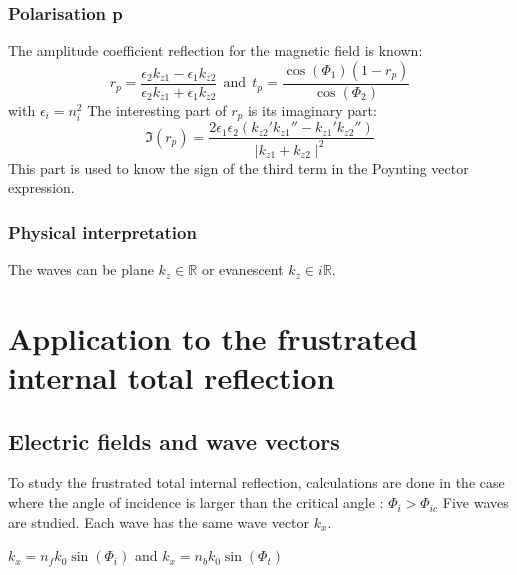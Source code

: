 \subsubsection{Polarisation p}
The amplitude coefficient reflection for the magnetic field is known:
$$
r_p=\frac{\epsilon_2k_{z1}-\epsilon_1k_{z2}}{\epsilon_2k_{z1}+\epsilon_1k_{z2}}
 \ \ \text{and} \ \ t_p = \frac{\cos(\Phi_1)(1-r_p)}{\cos(\Phi_2)}$$
with $\epsilon_i=n_i^2$
The interesting part of $r_p$ is its imaginary part:\\
\begin{equation*}
\Im(r_p) = \frac{2\epsilon_1\epsilon_2(k_{z2}'k_{z1}''-k_{z1}'k_{z2}'')}{\mid k_{z1}+k_{z2}\mid^2}
\end{equation*}
This part is used to know the sign of the third term in the Poynting vector expression.
\subsubsection{Physical interpretation}
The waves can be plane $k_{z}\in \mathbb{R}$ or evanescent $k_{z}\in i\mathbb{R}$.


\section{Application to the frustrated internal total reflection}

\subsection{Electric fields and wave vectors}
To study the frustrated total internal reflection, calculations are done in the case where the angle of incidence is larger than the critical angle :
$\Phi_i > \Phi_{ic}$
Five waves are studied. Each wave has the same wave vector $k_x$.
\begin{center}
$k_x=n_fk_0\sin(\Phi_i)$ and $k_x=n_bk_0\sin(\Phi_t)$\\
\end{center}

